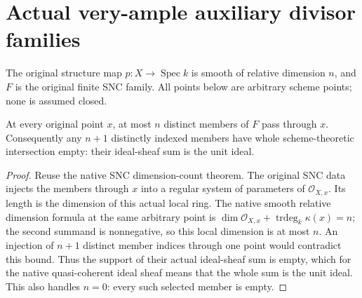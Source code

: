 \section{Actual very-ample auxiliary divisor families}

The original structure map $p:X\to\operatorname{Spec}k$ is smooth of
relative dimension $n$, and $F$ is the original finite SNC family.
All points below are arbitrary scheme points; none is assumed closed.

\begin{lemma}
\label{lem:kn-nadel-bertini-auxiliary-dimension}
\leanok
At every original point $x$, at most $n$ distinct members of $F$ pass
through $x$. Consequently any $n+1$ distinctly indexed members have
whole scheme-theoretic intersection empty: their ideal-sheaf sum is the
unit ideal.
\end{lemma}
\begin{proof}
Reuse the native SNC dimension-count theorem. The original SNC data
injects the members through $x$ into a regular system of parameters of
$\mathcal O_{X,x}$. Its length is the dimension of this actual local
ring. The native smooth relative dimension formula at the same
arbitrary point is
$\dim\mathcal O_{X,x}+\operatorname{trdeg}_k\kappa(x)=n$;
the second summand is nonnegative, so this local dimension is at most
$n$. An injection of $n+1$ distinct member indices through one point
would contradict this bound. Thus the support of their actual
ideal-sheaf sum is empty, which for the native quasi-coherent ideal
sheaf means that the whole sum is the unit ideal. This also handles
$n=0$: every such selected member is empty.
\end{proof}

